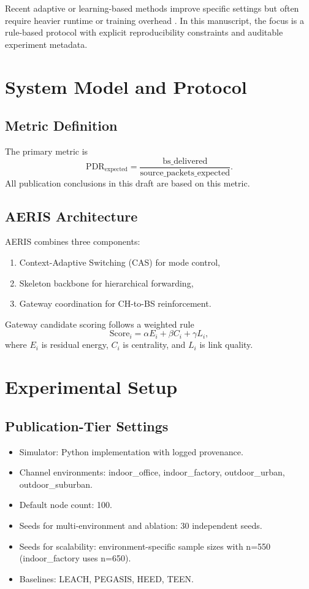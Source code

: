 \documentclass[sensors,article,submit,moreauthors,pdftex]{Definitions/mdpi}
\begin{document}
Recent adaptive or learning-based methods improve specific settings but often require heavier runtime or training overhead \cite{Ren2024,Okine2024}. In this manuscript, the focus is a rule-based protocol with explicit reproducibility constraints and auditable experiment metadata.

\section{System Model and Protocol}
\subsection{Metric Definition}
The primary metric is
\begin{equation}
\mathrm{PDR}_{\mathrm{expected}} = \frac{\mathrm{bs\_delivered}}{\mathrm{source\_packets\_expected}}.
\end{equation}
All publication conclusions in this draft are based on this metric.

\subsection{AERIS Architecture}
AERIS combines three components:
\begin{enumerate}
\item Context-Adaptive Switching (CAS) for mode control,
\item Skeleton backbone for hierarchical forwarding,
\item Gateway coordination for CH-to-BS reinforcement.
\end{enumerate}
Gateway candidate scoring follows a weighted rule
\begin{equation}
\mathrm{Score}_i = \alpha E_i + \beta C_i + \gamma L_i,
\end{equation}
where $E_i$ is residual energy, $C_i$ is centrality, and $L_i$ is link quality.

\section{Experimental Setup}
\subsection{Publication-Tier Settings}
\begin{itemize}
\item Simulator: Python implementation with logged provenance.
\item Channel environments: indoor\_office, indoor\_factory, outdoor\_urban, outdoor\_suburban.
\item Default node count: 100.
\item Seeds for multi-environment and ablation: 30 independent seeds.
\item Seeds for scalability: environment-specific sample sizes with n=550 (indoor\_factory uses n=650).
\item Baselines: LEACH, PEGASIS, HEED, TEEN.
\end{itemize}
\end{document}
